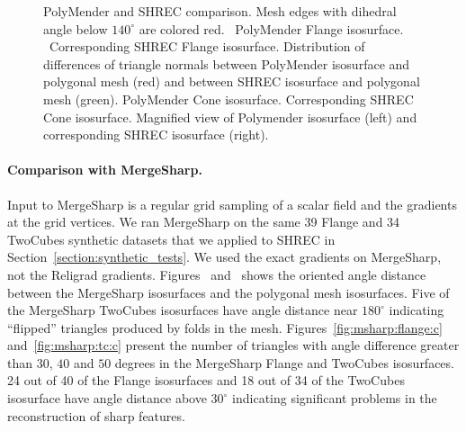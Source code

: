 \begin{figure}[t]
\caption{PolyMender and SHREC comparison.
Mesh edges with dihedral angle below $140^\circ$ are colored red.
\protect{}~PolyMender Flange isosurface.
\protect{}~Corresponding SHREC Flange isosurface.
\protect{} Distribution of differences of triangle normals
between PolyMender isosurface and polygonal mesh (red)
and between SHREC isosurface and polygonal mesh (green).
\protect{} PolyMender Cone isosurface.
\protect{} Corresponding SHREC Cone isosurface.
\protect{} Magnified view of Polymender isosurface (left)
and corresponding SHREC isosurface (right).
} 
\label{fig:polymenderB}
\end{figure}


\paragraph{Comparison with MergeSharp.}


Input to MergeSharp is a regular grid sampling of a scalar field
and the gradients at the grid vertices.
We ran MergeSharp on the same 39 Flange and 34 TwoCubes synthetic datasets
that we applied to SHREC in Section~\ref{section:synthetic_tests}.
We used the exact gradients on MergeSharp, not the Religrad gradients.
Figures~ and~
shows the oriented angle distance between the MergeSharp isosurfaces 
and the polygonal mesh isosurfaces.
Five of the MergeSharp TwoCubes isosurfaces have angle distance 
near $180^\circ$ indicating ``flipped'' triangles produced by folds
in the mesh.
Figures~\ref{fig:msharp:flange:c} and~\ref{fig:msharp:tc:c} 
present the number of triangles with angle difference greater
than $30$, $40$ and $50$ degrees 
in the MergeSharp Flange and TwoCubes isosurfaces.
24 out of 40 of the Flange isosurfaces and 18 out of 34 
of the TwoCubes isosurface have angle distance above $30^\circ$
indicating significant problems in the reconstruction of sharp features.

